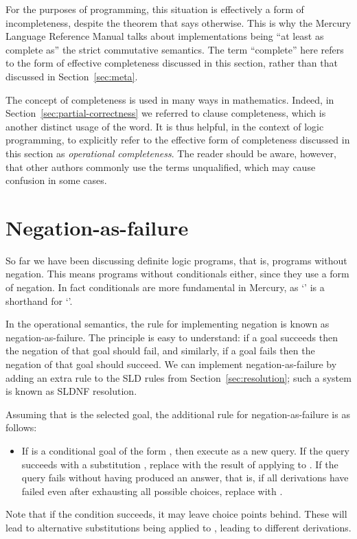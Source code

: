 For the purposes of programming,
this situation is effectively a form of incompleteness,
despite the theorem that says otherwise.
This is why the Mercury Language Reference Manual
talks about implementations being
``at least as complete as'' the strict commutative semantics.
The term ``complete'' here refers to
the form of effective completeness discussed in this section,
rather than that discussed in Section~\ref{sec:meta}.

The concept of completeness is used in many ways in mathematics.
Indeed,
in Section~\ref{sec:partial-correctness}
we referred to clause completeness,
which is another distinct usage of the word.
It is thus helpful, in the context of logic programming,
to explicitly refer to the effective form of completeness
discussed in this section as \emph{operational completeness}.
The reader should be aware, however,
that other authors commonly use the terms unqualified,
which may cause confusion in some cases.


\section{Negation-as-failure}
\label{sec:naf}

So far we have been discussing definite logic programs,
that is, programs without negation.
This means programs without conditionals either,
since they use a form of negation.
In fact conditionals are more fundamental in Mercury,
as `' is a shorthand for
`'.

In the operational semantics,
the rule for implementing negation is known as negation-as-failure.
The principle is easy to understand:
if a goal succeeds then
the negation of that goal should fail,
and similarly, if a goal fails then
the negation of that goal should succeed.
We can implement negation-as-failure
by adding an extra rule to the SLD rules
from Section~\ref{sec:resolution};
such a system is known as SLDNF resolution.

Assuming that  is the selected goal,
the additional rule for negation-as-failure
is as follows:
\begin{itemize}
\item
If  is a conditional goal of the form
,
then execute  as a new query.
If the query succeeds with a substitution ,
replace  with
the result of applying  to .
If the query fails without having produced an answer,
that is, if all derivations have failed
even after exhausting all possible choices,
replace  with .
\end{itemize}
Note that if the condition succeeds,
it may leave choice points behind.
These will lead to alternative substitutions
being applied to ,
leading to different derivations.

